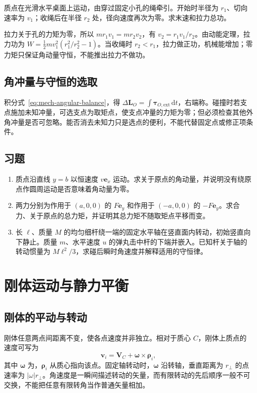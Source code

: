 \documentclass[UTF8,12pt,a4paper,fontset=fandol]{ctexbook}
\begin{document}
\begin{example}[穿孔细绳收缩圆周运动]
质点在光滑水平桌面上运动，由穿过固定小孔的绳牵引。开始时半径为 $r_1$、切向速率为 $v_1$；收绳后在半径 $r_2$ 处，径向速度再次为零。求末速和拉力总功。
\end{example}
\begin{solve}
拉力关于孔的力矩为零，所以 $mr_1v_1=mr_2v_2$，有 $v_2=r_1v_1/r_2$。由动能定理，拉力功为 $W=\tfrac12mv_1^2(r_1^2/r_2^2-1)$。当收绳时 $r_2<r_1$，拉力做正功，机械能增加；零力矩只保证角动量守恒，不能推出拉力不做功。
\end{solve}

\section{角冲量与守恒的选取}
积分式~\eqref{eq:mech-angular-balance}，得 $\Delta\mathbf L_O=\int\boldsymbol\tau_{O,\mathrm{ext}}\,\mathrm dt$，右端称。碰撞时若支点施加未知冲量，可选支点为取矩点，使支点冲量的力矩为零；但必须检查其他外角冲量是否可忽略。能否消去未知力只是选点的便利，不能代替固定点或修正项条件。

\section{习题}
\begin{enumerate}[label=\thechapter.\arabic*,ref=\thechapter.\arabic*]
\item\label{exr:mech-straight-L} 质点沿直线 $y=b$ 以恒速度 $v\mathbf e_x$ 运动。求关于原点的角动量，并说明没有绕原点作圆周运动是否意味着角动量为零。
\item\label{exr:mech-couple} 两力分别为作用于 $(a,0,0)$ 的 $F\mathbf e_y$ 和作用于 $(-a,0,0)$ 的 $-F\mathbf e_y$。求合力、关于原点的总力矩，并证明其总力矩不随取矩点平移而变。
\item\label{exr:mech-stick-impact} 长 $\ell$、质量 $M$ 的均匀细杆绕一端的固定水平轴在竖直面内转动，初始竖直向下静止。质量 $m$、水平速度 $u$ 的弹丸击中杆的下端并嵌入。已知杆关于轴的转动惯量为 $M\ell^2/3$，求碰后瞬时角速度并解释适用的守恒律。
\end{enumerate}

\chapter{刚体运动与静力平衡}
\label{chap:mech-rigid}

\section{刚体的平动与转动}
刚体任意两点间距离不变，使各点速度并非独立。相对于质心 $C$，刚体上质点的速度可写为
\begin{equation}
 \mathbf v_i=\mathbf V_C+\boldsymbol\omega\times\boldsymbol\rho_i,
 \label{eq:mech-rigid-velocity}
\end{equation}
其中 $\boldsymbol\omega$ 为，$\boldsymbol\rho_i$ 从质心指向该点。固定轴转动时，$\boldsymbol\omega$ 沿转轴，垂直距离为 $r_\perp$ 的点速率为 $|\omega|r_\perp$。角速度是一瞬间描述转动的矢量，而有限转动的先后顺序一般不可交换，不能把任意有限转角当作普通矢量相加。
\end{document}
